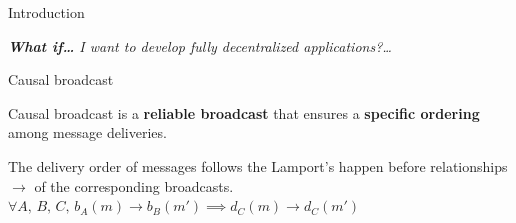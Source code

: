 \documentclass[10pt, xcolor={usenames, dvipsnames}]{beamer}
\begin{document}
\begin{frame}{Introduction}
    \vspace{4em}



    \textit{\textbf{What if\ldots} I want to develop fully decentralized applications?\ldots}

\end{frame}


\begin{frame}{Causal broadcast}

  Causal broadcast is a \textbf{reliable broadcast} that ensures a
  \textbf{specific ordering} among message deliveries.
  

  \vspace{1em}

  \begin{definition}
    The delivery order of messages follows the Lamport's happen before relationships
    $\rightarrow$ of the corresponding broadcasts.
    $\forall A,\,B,\,C,\, b_A(m) \rightarrow b_B(m') \implies d_C(m) \rightarrow
    d_C(m')$
  \end{definition}

  
  \begin{minipage}{0.49\textwidth}
    \begin{center}
    
    \end{center}
  \end{minipage}
  \begin{minipage}{0.49\textwidth}
    \begin{center}
    
    \end{center}
  \end{minipage}


\end{frame}
\end{document}
